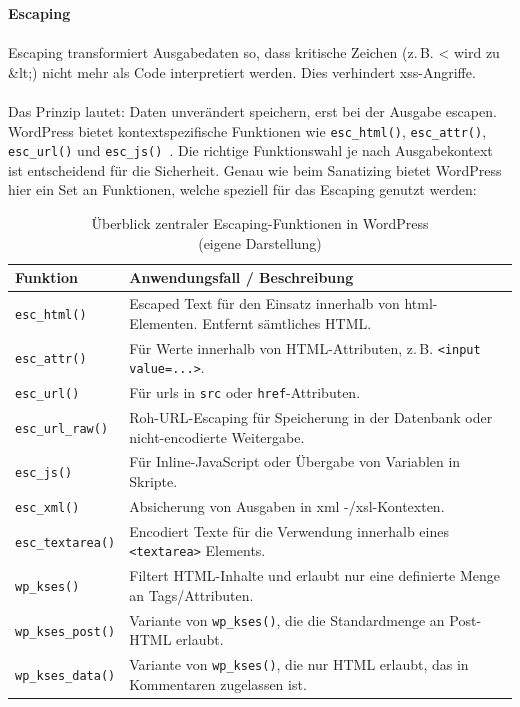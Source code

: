 \newpage

\textbf{Escaping}\\\\
Escaping transformiert Ausgabedaten so, dass kritische Zeichen (z.\,B. \grqq{}<\grqq{} wird zu \grqq{}\&lt;\grqq{}) nicht mehr als Code interpretiert werden. Dies verhindert \gls{xss}-Angriffe.\\\\
Das Prinzip lautet: Daten unverändert speichern, erst bei der Ausgabe escapen.
WordPress bietet kontextspezifische Funktionen wie \texttt{esc\_html()}, \texttt{esc\_attr()}, \texttt{esc\_url()} und \texttt{esc\_js()}~\cite{wordpress2024escapingfunc}.
Die richtige Funktionswahl je nach Ausgabekontext ist entscheidend für die Sicherheit.
Genau wie beim Sanatizing bietet WordPress hier ein Set an Funktionen, welche speziell für das Escaping genutzt werden:

\begin{table}[H]
 \centering
 \begin{tabular}{|l|p{9cm}|}
  \hline
  \textbf{Funktion} & \textbf{Anwendungsfall / Beschreibung} \\
  \hline
  \texttt{esc\_html()}      & Escaped Text für den Einsatz innerhalb von \gls{html}-Elementen. Entfernt sämtliches HTML. \\
  \hline
  \texttt{esc\_attr()} & Für Werte innerhalb von HTML-Attributen, z.\,B. \texttt{<input value=\grqq{}...\grqq{}>}. \\
  \hline
  \texttt{esc\_url()}       & Für \gls{url}s in \texttt{src} oder \texttt{href}-Attributen. \\
  \hline
  \texttt{esc\_url\_raw()} & Roh-URL-Escaping für Speicherung in der Datenbank oder nicht-encodierte Weitergabe. \\
  \hline
  \texttt{esc\_js()} & Für Inline-JavaScript oder Übergabe von Variablen in Skripte. \\
  \hline
  \texttt{esc\_xml()}       & Absicherung von Ausgaben in \gls{xml} -/\gls{xsl}-Kontexten.                             \\
  \hline
  \texttt{esc\_textarea()} & Encodiert Texte für die Verwendung innerhalb eines \texttt{<textarea>} Elements. \\
  \hline
  \texttt{wp\_kses()} & Filtert HTML-Inhalte und erlaubt nur eine definierte Menge an Tags/Attributen. \\
  \hline
  \texttt{wp\_kses\_post()} & Variante von \texttt{wp\_kses()}, die die Standardmenge an Post-HTML erlaubt. \\
  \hline
  \texttt{wp\_kses\_data()} & Variante von \texttt{wp\_kses()}, die nur HTML erlaubt, das in Kommentaren zugelassen ist. \\
  \hline
 \end{tabular}
 \caption{Überblick zentraler Escaping-Funktionen in WordPress \\(eigene Darstellung)}
 \label{tab:escaping}
\end{table}

